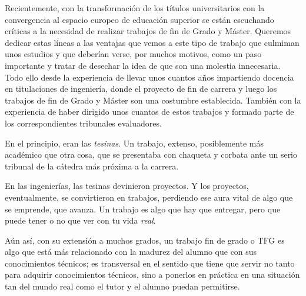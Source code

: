 
Recientemente, con la transformación de los títulos universitarios con la convergencia al espacio europeo de educación superior se están escuchando críticas a la necesidad de realizar trabajos de fin de Grado y Máster.
Queremos dedicar estas líneas a las ventajas que vemos a este tipo de trabajo que culmiman unos estudios y que deberían verse, por muchos motivos, como un paso importante y tratar de desechar la idea de que son una molestia innecesaria.
Todo ello desde la experiencia de llevar unos cuantos años impartiendo docencia en titulaciones de ingeniería, donde el proyecto de fin de carrera y luego los trabajos de fin de Grado y Máster son una costumbre establecida. También con la experiencia de haber dirigido unos cuantos de estos trabajos y formado parte de los correspondientes tribunales evaluadores.

En el principio, eran las {\em tesinas}. Un trabajo, extenso, posiblemente más académico que otra cosa, que se presentaba con chaqueta y corbata ante un serio tribunal de la cátedra más próxima a la carrera.

En las ingenierías, las tesinas devinieron proyectos. %
 Y los proyectos, eventualmente, se convirtieron en trabajos, perdiendo ese aura vital de algo que se emprende, que avanza. Un trabajo es algo que hay que entregar, pero que puede tener o no que ver con tu vida {\em real}.

Aún así, con su extensión a muchos grados, un trabajo fin de grado o TFG es algo que está más relacionado con la madurez del alumno que con sus conocimientos técnicos; es transversal en el sentido que tiene que servir no tanto para adquirir conocimientos técnicos, sino a ponerlos en práctica en una situación tan del mundo real como el tutor y el alumno puedan permitirse. 

